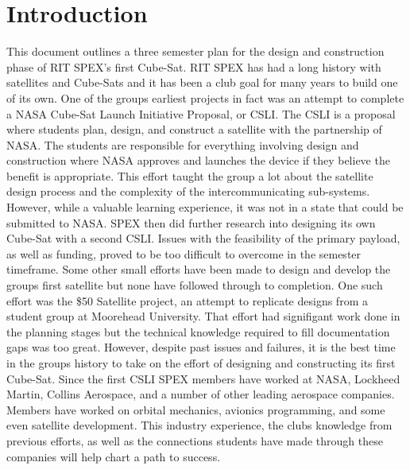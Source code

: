 \documentclass[conference]{IEEEtran} %
\begin{document}

\section{Introduction}
\label{sec:introduction}

\IEEEPARstart This document outlines a three semester plan for the design and construction phase of RIT SPEX's first Cube-Sat.  RIT SPEX has had a long history with satellites and Cube-Sats and it has been a club goal for many years to build one of its own.  One of the groups earliest projects in fact was an attempt to complete a NASA Cube-Sat Launch Initiative Proposal, or CSLI.   The CSLI is a proposal where students plan, design, and construct a satellite with the partnership of NASA.  The students are responsible for everything involving design and construction where NASA approves and launches the device if they believe the benefit is appropriate.  This effort taught the group a lot about the satellite design process and the complexity of the intercommunicating sub-systems.  However, while a valuable learning experience, it was not in a state that could be submitted to NASA.  SPEX then did further research into designing its own Cube-Sat with a second CSLI.  Issues with the feasibility of the primary payload, as well as funding, proved to be too difficult to overcome in the semester timeframe.  Some other small efforts have been made to design and develop the groups first satellite but none have followed through to completion.  One such effort was the \$50 Satellite project, an attempt to replicate designs from a student group at Moorehead University.  That effort had signifigant work done in the planning stages but the technical knowledge required to fill documentation gaps was too great.
However, despite past issues and failures, it is the best time in the groups history to take on the effort of designing and constructing its first Cube-Sat.  Since the first CSLI SPEX members have worked at NASA, Lockheed Martin, Collins Aerospace, and a number of other leading aerospace companies.  Members have worked on orbital mechanics, avionics programming, and some even satellite development.  This industry experience, the clubs knowledge from previous efforts, as well as the connections students have made through these companies will help chart a path to success.
\end{document}
